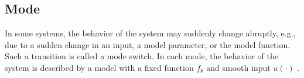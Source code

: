\subsection{Mode}
\label{sec:mode}

In some systems, the behavior of the system may suddenly change abruptly, e.g., due to a sudden change in an input, a model parameter, or the model function. Such a transition is called a mode switch.
In each mode, the behavior of the system is described by a model with a fixed function $f_{\theta}$ and smooth input $u(\cdot)$ \autocite{deschutter2000optimal}.


